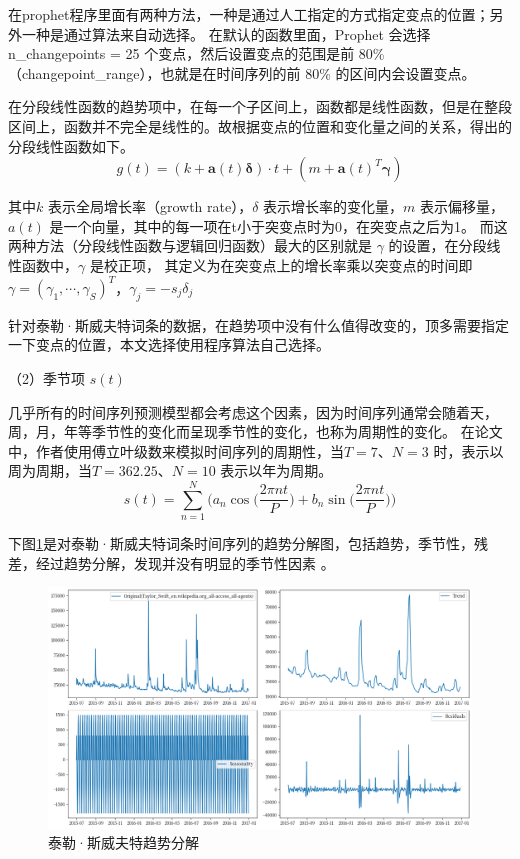 在prophet程序里面有两种方法，一种是通过人工指定的方式指定变点的位置；另外一种是通过算法来自动选择。
在默认的函数里面，Prophet 会选择 n\_changepoints = 25 个变点，然后设置变点的范围是前 80\%（changepoint\_range），也就是在时间序列的前 80\% 的区间内会设置变点。

在分段线性函数的趋势项中，在每一个子区间上，函数都是线性函数，但是在整段区间上，函数并不完全是线性的。故根据变点的位置和变化量之间的关系，得出的分段线性函数如下。
\begin{equation}
  g(t) = (k + \mathbf{a}(t)\mathbf{\delta}) \cdot t + (m + \mathbf{a}(t)^T\mathbf{\gamma})
\end{equation}

其中$k$ 表示全局增长率（growth rate），$\delta$ 表示增长率的变化量，$m$ 表示偏移量，$a(t)$ 是一个向量，其中的每一项在t小于突变点时为0，在突变点之后为1。
而这两种方法（分段线性函数与逻辑回归函数）最大的区别就是 $\gamma$ 的设置，在分段线性函数中，$\gamma$ 是校正项，
其定义为在突变点上的增长率乘以突变点的时间即 $\gamma=(\gamma_{1},\cdots,\gamma_{S})^{T}$，$\gamma_{j}=-s_{j}\delta_{j}$ 

针对泰勒·斯威夫特词条的数据，在趋势项中没有什么值得改变的，顶多需要指定一下变点的位置，本文选择使用程序算法自己选择。

（2）季节项 $s(t)$

几乎所有的时间序列预测模型都会考虑这个因素，因为时间序列通常会随着天，周，月，年等季节性的变化而呈现季节性的变化，也称为周期性的变化。
在论文中\cite{taylor2018forecasting}，作者使用傅立叶级数来模拟时间序列的周期性，当$T = 7、N = 3$ 时，表示以周为周期，当$T = 362.25、N = 10$ 表示以年为周期。
\begin{equation}
  s(t) = \sum_{n=1}^{N}\bigg( a_{n}\cos\bigg(\frac{2\pi n t}{P}\bigg) + b_{n}\sin\bigg(\frac{2\pi n t}{P}\bigg)\bigg)
\end{equation}

下图\ref{Trend-decomposition}是对泰勒·斯威夫特词条时间序列的趋势分解图，包括趋势，季节性，残差，经过趋势分解，发现并没有明显的季节性因素
。

\begin{figure}[htb]
  \centering
  \includegraphics[width=\textwidth]{figures/Trend-decomposition.png}
  \caption{泰勒·斯威夫特趋势分解}
  \label{Trend-decomposition}
\end{figure}

